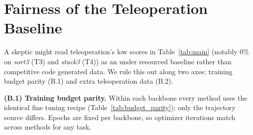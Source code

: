 \documentclass{article}
\begin{document}

\section{Fairness of the Teleoperation Baseline}
\label{app:teleop}

A skeptic might read teleoperation's low scores in Table~\ref{tab:main} (notably
$0\%$ on \textit{sort3} (T3) and \textit{stack3} (T4)) as an under resourced
baseline rather than competitive code generated data. We rule this out along two
axes: training budget parity (B.1) and extra teleoperation data (B.2).

\textbf{(B.1) Training budget parity.}
Within each backbone every method uses the identical fine tuning recipe
(Table~\ref{tab:budget_parity}); only the trajectory source differs. Epochs are
fixed per backbone, so optimizer iterations match across methods for any task.

\begin{table}[h]
\centering
\caption{Training budget parity. Within each backbone all values are constant across the $10$ tasks and four methods; only the trajectory source differs. Both backbones use AdamW with a cosine schedule with warmup.}
\label{tab:budget_parity}
\small
\setlength{\tabcolsep}{6pt}
\end{table}
\end{document}
